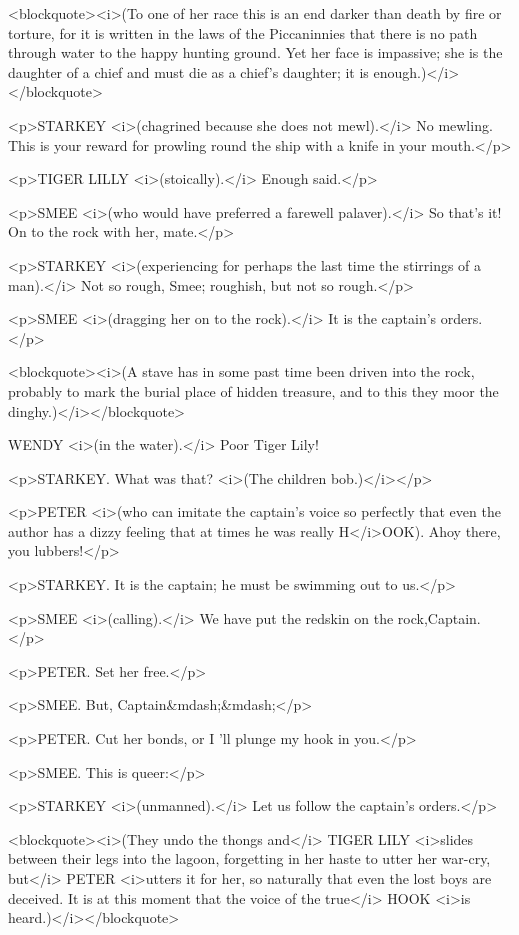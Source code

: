 <blockquote><i>(To one of her race this is an end darker than death by fire or torture, for it is written in the laws of the Piccaninnies that there is no path through water to the happy hunting ground. Yet her face is impassive; she is the daughter of a chief and must die as a chief's daughter; it is enough.)</i></blockquote>

<p>STARKEY <i>(chagrined because she does not mewl).</i> No mewling. This is your reward for prowling round the ship with a knife in your mouth.</p>

<p>TIGER LILLY <i>(stoically).</i> Enough said.</p>

<p>SMEE <i>(who would have preferred a farewell palaver).</i> So that's it! On to the rock with her, mate.</p>

<p>STARKEY <i>(experiencing for perhaps the last time the stirrings of a man).</i> Not so rough, Smee; roughish, but not so rough.</p>

<p>SMEE <i>(dragging her on to the rock).</i> It is the captain's orders.</p>

<blockquote><i>(A stave has in some past time been driven into the rock, probably to mark the burial place of hidden treasure, and to this they moor the dinghy.)</i></blockquote>

WENDY <i>(in the water).</i> Poor Tiger Lily! 

<p>STARKEY. What was that? <i>(The children bob.)</i></p>

<p>PETER <i>(who can imitate the captain's voice so perfectly that even the author has a dizzy feeling that at times he was really H</i>OOK). Ahoy there, you lubbers!</p>

<p>STARKEY. It is the captain; he must be swimming out to us.</p>

<p>SMEE <i>(calling).</i> We have put the redskin on the rock,Captain.</p>

<p>PETER. Set her free.</p>

<p>SMEE. But, Captain&mdash;&mdash;</p>

<p>PETER. Cut her bonds, or I 'll plunge my hook in you.</p>

<p>SMEE. This is queer:</p>

<p>STARKEY <i>(unmanned).</i> Let us follow the captain's orders.</p>

<blockquote><i>(They undo the thongs and</i> TIGER LILY <i>slides between their legs into the lagoon, forgetting in her haste to utter her war-cry, but</i> PETER <i>utters it for her, so naturally that even the lost boys are deceived. It is at this moment that the voice of the true</i> HOOK <i>is heard.)</i></blockquote>

